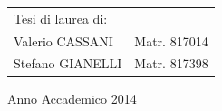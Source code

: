 \begin{titlepage}
\begin{flushright}
\begin{tabular}{ll}
Tesi di laurea di: & \tabularnewline
Valerio CASSANI & Matr. 817014\tabularnewline
Stefano GIANELLI & Matr. 817398\tabularnewline
\end{tabular}\vspace{2.2cm}

\par\end{flushright}

\begin{center}
{\large{}Anno Accademico 2014}
\par\end{center}{\large \par}

\end{titlepage}
